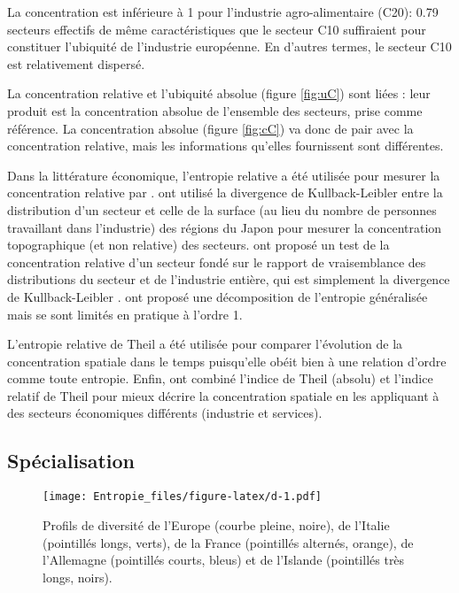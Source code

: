 \documentclass[fleqn,10pt]{ArtEcoFoG} %
\begin{document}
La concentration est inférieure à 1 pour l'industrie agro-alimentaire
(C20): 0.79 secteurs effectifs de même caractéristiques que le secteur
C10 suffiraient pour constituer l'ubiquité de l'industrie européenne. En
d'autres termes, le secteur C10 est relativement dispersé.

La concentration relative et l'ubiquité absolue (figure \ref{fig:uC})
sont liées : leur produit est la concentration absolue de l'ensemble des
secteurs, prise comme référence. La concentration absolue (figure
\ref{fig:cC}) va donc de pair avec la concentration relative, mais les
informations qu'elles fournissent sont différentes.

Dans la littérature économique, l'entropie relative a été utilisée pour
mesurer la concentration relative par \citet{Brulhart2005}.
\citet{Mori2005} ont utilisé la divergence de Kullback-Leibler entre la
distribution d'un secteur et celle de la surface (au lieu du nombre de
personnes travaillant dans l'industrie) des régions du Japon pour
mesurer la concentration topographique (et non relative) des secteurs.
\citet{Rysman2005} ont proposé un test de la concentration relative d'un
secteur fondé sur le rapport de vraisemblance des distributions du
secteur et de l'industrie entière, qui est simplement la divergence de
Kullback-Leibler \citep[voir][ pour une présentation détaillée des liens
entre les deux approches]{Mori2005}. \citet{Alonso-Villar2013} ont
proposé une décomposition de l'entropie généralisée mais se sont limités
en pratique à l'ordre 1.

L'entropie relative de Theil a été utilisée pour comparer l'évolution de
la concentration spatiale dans le temps \citep[par
exemple,][]{Cutrini2010} puisqu'elle obéit bien à une relation d'ordre
comme toute entropie. Enfin, \citet{Bickenbach2013} ont combiné l'indice
de Theil (absolu) et l'indice relatif de Theil pour mieux décrire la
concentration spatiale en les appliquant à des secteurs économiques
différents (industrie et services).

\subsection{Spécialisation}\label{specialisation}

\begin{figure}
\centering
\texttt{[image: Entropie\_files/figure-latex/d-1.pdf]}
\caption{\label{fig:d}Profils de diversité de l'Europe (courbe pleine,
noire), de l'Italie (pointillés longs, verts), de la France (pointillés
alternés, orange), de l'Allemagne (pointillés courts, bleus) et de
l'Islande (pointillés très longs, noirs).}
\end{figure}
\end{document}
